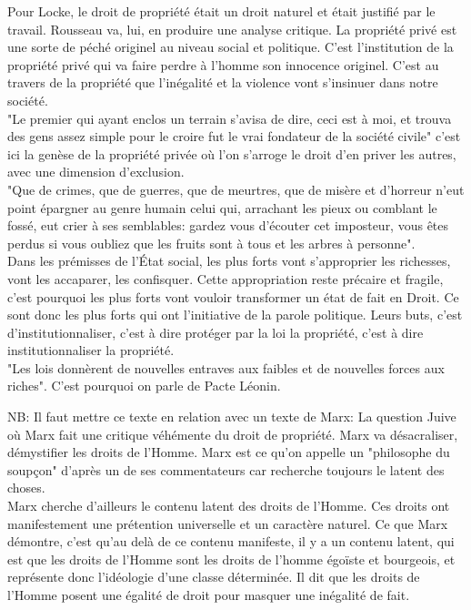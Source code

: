 \documentclass[10pt, a4paper, openany]{book}
\begin{document}
Pour Locke, le droit de propriété était un droit naturel et était justifié par le travail. Rousseau va, lui, en produire une analyse critique. La propriété privé est une sorte de péché originel au niveau social et politique. C'est l'institution de la propriété privé qui va faire perdre à l'homme son innocence originel. C'est au travers de la propriété que l'inégalité et la violence vont s'insinuer dans notre société. \\
"Le premier qui ayant enclos un terrain s'avisa de dire, ceci est à moi, et trouva des gens assez simple pour le croire fut le vrai fondateur de la société civile" c'est ici la genèse de la propriété privée où l'on s'arroge le droit d'en priver les autres, avec une dimension d'exclusion. \\
"Que de crimes, que de guerres, que de meurtres, que de misère et d'horreur n'eut point épargner au genre humain celui qui, arrachant les pieux ou comblant le fossé, eut crier à ses semblables: gardez vous d'écouter cet imposteur, vous êtes perdus si vous oubliez que les fruits sont à tous et les arbres à personne". \\
Dans les prémisses de l'État social, les plus forts vont s'approprier les richesses, vont les accaparer, les confisquer. Cette appropriation reste précaire et fragile, c'est pourquoi les plus forts vont vouloir transformer un état de fait en Droit. Ce sont donc les plus forts qui ont l'initiative de la parole politique. Leurs buts, c'est d'institutionnaliser, c'est à dire protéger par la loi la propriété, c'est à dire institutionnaliser la propriété. \\
"Les lois donnèrent de nouvelles entraves aux faibles et de nouvelles forces aux riches". C'est pourquoi on parle de Pacte Léonin.


NB: Il faut mettre ce texte en relation avec un texte de Marx: La question Juive où Marx fait une critique véhémente du droit de propriété. Marx va désacraliser, démystifier les droits de l'Homme. Marx est ce qu'on appelle un "philosophe du soupçon" d'après un de ses commentateurs car recherche toujours le latent des choses. \\
Marx cherche d'ailleurs le contenu latent des droits de l'Homme. Ces droits ont manifestement une prétention universelle et un caractère naturel. Ce que Marx démontre, c'est qu'au delà de ce contenu manifeste, il y a un contenu latent, qui est que les droits de l'Homme sont les droits de l'homme égoïste et bourgeois, et représente donc l'idéologie d'une classe déterminée. Il dit que les droits de l'Homme posent une égalité de droit pour masquer une inégalité de fait. 
\end{document}
